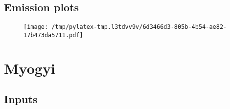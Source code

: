 \documentclass{article}%
\begin{document}
\subsection{Emission plots}%
\label{subsec:Emissionplots}%


\begin{figure}[htbp]%
\centering%
\texttt{[image: /tmp/pylatex-tmp.l3tdvv9v/6d3466d3-805b-4b54-ae82-17b473da5711.pdf]}%
\end{figure}

%
\section{Myogyi}%
\label{sec:Myogyi}%
\subsection{Inputs}%
\label{subsec:Inputs}%
\end{document}
